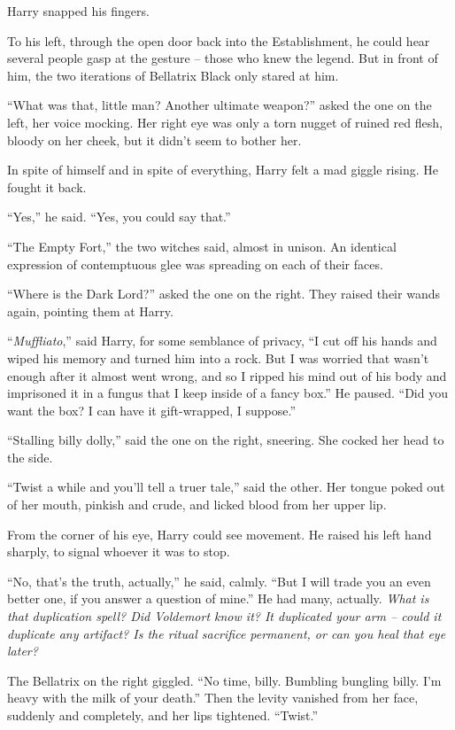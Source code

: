 Harry snapped his fingers.

To his left, through the open door back into the Establishment, he could
hear several people gasp at the gesture -- those who knew the legend.
But in front of him, the two iterations of Bellatrix Black only stared
at him.

``What was that, little man? Another ultimate weapon?'' asked the one on
the left, her voice mocking. Her right eye was only a torn nugget of
ruined red flesh, bloody on her cheek, but it didn't seem to bother her.

In spite of himself and in spite of everything, Harry felt a mad giggle
rising. He fought it back.

``Yes,'' he said. ``Yes, you could say that.''

``The Empty Fort,'' the two witches said, almost in unison. An identical
expression of contemptuous glee was spreading on each of their faces.

``Where is the Dark Lord?'' asked the one on the right. They raised
their wands again, pointing them at Harry.

``\emph{Muffliato},'' said Harry, for some semblance of privacy, ``I cut
off his hands and wiped his memory and turned him into a rock. But I was
worried that wasn't enough after it almost went wrong, and so I ripped
his mind out of his body and imprisoned it in a fungus that I keep
inside of a fancy box.'' He paused. ``Did you want the box? I can have
it gift-wrapped, I suppose.''

``Stalling billy dolly,'' said the one on the right, sneering. She
cocked her head to the side.

``Twist a while and you'll tell a truer tale,'' said the other. Her
tongue poked out of her mouth, pinkish and crude, and licked blood from
her upper lip.

From the corner of his eye, Harry could see movement. He raised his left
hand sharply, to signal whoever it was to stop.

``No, that's the truth, actually,'' he said, calmly. ``But I will trade
you an even better one, if you answer a question of mine.'' He had many,
actually. \emph{What is that duplication spell? Did Voldemort know it?
It duplicated your arm -- could it duplicate any artifact? Is the ritual
sacrifice permanent, or can you heal that eye later?}

The Bellatrix on the right giggled. ``No time, billy. Bumbling bungling
billy. I'm heavy with the milk of your death.'' Then the levity vanished
from her face, suddenly and completely, and her lips tightened.
``Twist.''


